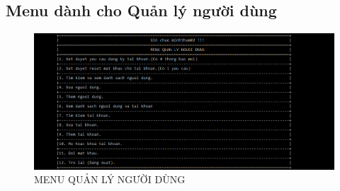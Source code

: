 \documentclass[16pt,a4paper,oneside]{article}
\begin{document}
\subsection{Menu dành cho Quản lý người dùng}
\begin{figure}[htp]
	\begin{center}
		\includegraphics[width=18cm]{Images/menu_quanly.png}
		\caption{MENU QUẢN LÝ NGƯỜI DÙNG}
	\end{center}
\end{figure}
\end{document}
